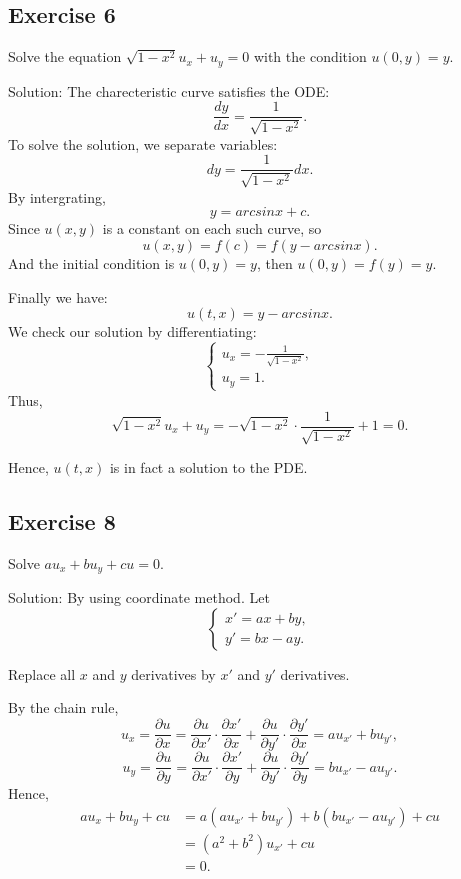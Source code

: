 \documentclass{article}
\begin{document}
    \subsection{Exercise 6}
	Solve the equation $\sqrt{1-x^2}u_x+u_y=0$ with the condition $u(0, y)=y.$
		
            Solution: The charecteristic curve satisfies the ODE: 
            \[ \frac{dy}{dx}=\frac{1}{\sqrt{1-x^2}}.\]
			To solve the solution, we separate variables: 		
			\[ dy=\frac{1}{\sqrt{1-x^2}}dx.\]
			By intergrating, \[y= arcsinx + c .\]
			Since $u(x,y)$ is a constant on each such curve, so
			\[ u(x,y)=f(c)=f(y - arcsinx).\]
			And the initial condition is $u(0,y)=y$, then $u(0,y)=f(y)=y.$

			Finally we have:
			\[u(t,x)=y - arcsinx.\]
			We check our solution by differentiating:
			\begin{equation*}
				\begin{cases}
					u_x=-\frac{1}{\sqrt{1-x^2}},
					\\
					u_y=1.
				\end{cases}
			\end{equation*}
			Thus, \[\sqrt{1-x^2}u_x+u_y=-\sqrt{1-x^2} \cdot \frac{1}{\sqrt{1-x^2}}+1=0.\]

			Hence, $u(t,x)$ is in fact a solution to the PDE.


		\subsection{Exercise 8}
		Solve $au_x+bu_y+cu=0.$
		
		Solution:
		By using coordinate method. Let 
		\begin{equation*}
			\begin{cases}
				x'=ax+by, \\
				y'=bx-ay.
			\end{cases}
		\end{equation*}

		Replace all $x$ and $y$ derivatives by $x'$ and $y'$ derivatives.

		By the chain rule, \[u_x=\frac{\partial u}{\partial x}=\frac{\partial u}{\partial x'}\cdot\frac{\partial x'}{\partial x}+\frac{\partial u}{\partial y'}\cdot\frac{\partial y'}{\partial x}=au_{x'}+bu_{y'},\]
		\[u_y=\frac{\partial u}{\partial y}=\frac{\partial u}{\partial x'}\cdot\frac{\partial x'}{\partial y}+\frac{\partial u}{\partial y'}\cdot\frac{\partial y'}{\partial y}=bu_{x'}-au_{y'}.\]
		Hence,
		\begin{equation*}
			\begin{aligned}
			au_x+bu_y+cu&=
			a\left(au_{x'}+bu_{y'} \right)+b\left(bu_{x'}-au_{y'}\right) +cu\\
			&=\left(a^2+b^2\right)u_{x'}+cu\\
			&=0.
			\end{aligned}
		\end{equation*}
\end{document}
